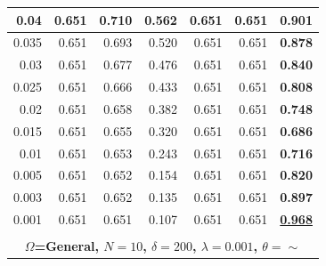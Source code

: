 \documentclass[letterpaper, 10 pt, conference]{ieeeconf}
\begin{document}
\begin{figure}[!h]
\begin{minipage}{\columnwidth}
{\begin{tabular}{|rrrrrrr|}
\multicolumn{1}{|r|}{0.04} & \multicolumn{1}{r|}{0.651} & \multicolumn{1}{r|}{0.710} & \multicolumn{1}{r|}{0.562} & \multicolumn{1}{r|}{0.651} & \multicolumn{1}{r|}{0.651} & \textbf{0.901} \\ \hline
\multicolumn{1}{|r|}{0.035} & \multicolumn{1}{r|}{0.651} & \multicolumn{1}{r|}{0.693} & \multicolumn{1}{r|}{0.520} & \multicolumn{1}{r|}{0.651} & \multicolumn{1}{r|}{0.651} & \textbf{0.878} \\ \hline
\multicolumn{1}{|r|}{0.03} & \multicolumn{1}{r|}{0.651} & \multicolumn{1}{r|}{0.677} & \multicolumn{1}{r|}{0.476} & \multicolumn{1}{r|}{0.651} & \multicolumn{1}{r|}{0.651} & \textbf{0.840} \\ \hline
\multicolumn{1}{|r|}{0.025} & \multicolumn{1}{r|}{0.651} & \multicolumn{1}{r|}{0.666} & \multicolumn{1}{r|}{0.433} & \multicolumn{1}{r|}{0.651} & \multicolumn{1}{r|}{0.651} & \textbf{0.808} \\ \hline
\multicolumn{1}{|r|}{0.02} & \multicolumn{1}{r|}{0.651} & \multicolumn{1}{r|}{0.658} & \multicolumn{1}{r|}{0.382} & \multicolumn{1}{r|}{0.651} & \multicolumn{1}{r|}{0.651} & \textbf{0.748} \\ \hline
\multicolumn{1}{|r|}{0.015} & \multicolumn{1}{r|}{0.651} & \multicolumn{1}{r|}{0.655} & \multicolumn{1}{r|}{0.320} & \multicolumn{1}{r|}{0.651} & \multicolumn{1}{r|}{0.651} & \textbf{0.686} \\ \hline
\multicolumn{1}{|r|}{0.01} & \multicolumn{1}{r|}{0.651} & \multicolumn{1}{r|}{0.653} & \multicolumn{1}{r|}{0.243} & \multicolumn{1}{r|}{0.651} & \multicolumn{1}{r|}{0.651} & \textbf{0.716} \\ \hline
\multicolumn{1}{|r|}{0.005} & \multicolumn{1}{r|}{0.651} & \multicolumn{1}{r|}{0.652} & \multicolumn{1}{r|}{0.154} & \multicolumn{1}{r|}{0.651} & \multicolumn{1}{r|}{0.651} & \textbf{0.820} \\ \hline
\multicolumn{1}{|r|}{0.003} & \multicolumn{1}{r|}{0.651} & \multicolumn{1}{r|}{0.652} & \multicolumn{1}{r|}{0.135} & \multicolumn{1}{r|}{0.651} & \multicolumn{1}{r|}{0.651} & \textbf{0.897} \\ \hline
\multicolumn{1}{|r|}{0.001} & \multicolumn{1}{r|}{0.651} & \multicolumn{1}{r|}{0.651} & \multicolumn{1}{r|}{0.107} & \multicolumn{1}{r|}{0.651} & \multicolumn{1}{r|}{0.651} & {\ul \textbf{0.968}} \\ \hline
\multicolumn{7}{|l|}{\cellcolor[HTML]{C0C0C0}} \\ \hline
\multicolumn{7}{|c|}{\textbf{$\Omega$=General, $N=10$,   $\delta=200$, $\lambda=0.001$, $\theta=\sim$}} \\ \hline

\end{tabular}}
\end{minipage}
\end{figure}
\end{document}
